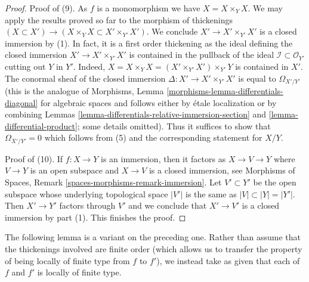 \begin{proof}
\medskip\noindent
Proof of (9). As $f$ is a monomorphism we have $X = X \times_Y X$.
We may apply the results proved so far to the morphism
of thickenings $(X \subset X') \to (X \times_Y X \subset X' \times_{Y'} X')$.
We conclude $X' \to X' \times_{Y'} X'$ is a closed immersion by (1).
In fact, it is a first order thickening as the ideal defining the
closed immersion $X' \to X' \times_{Y'} X'$ is contained in the pullback
of the ideal $\mathcal{I} \subset \mathcal{O}_{Y'}$ cutting out $Y$ in $Y'$.
Indeed, $X = X \times_Y X = (X' \times_{Y'} X') \times_{Y'} Y$ is contained
in $X'$. The conormal sheaf of the closed immersion
$\Delta : X' \to X' \times_{Y'} X'$ is equal to $\Omega_{X'/Y'}$
(this is the analogue of
Morphisms, Lemma \ref{morphisms-lemma-differentials-diagonal}
for algebraic spaces and follows either by \'etale localization
or by combining
Lemmas \ref{lemma-differentials-relative-immersion-section} and
\ref{lemma-differential-product}; some details omitted).
Thus it suffices to show that $\Omega_{X'/Y'} = 0$ which follows from (5)
and the corresponding statement for $X/Y$.

\medskip\noindent
Proof of (10). If $f : X \to Y$ is an immersion, then it factors as
$X \to V \to Y$ where $V \to Y$ is an open subspace and $X \to V$ is a
closed immersion, see
Morphisms of Spaces, Remark \ref{spaces-morphisms-remark-immersion}.
Let $V' \subset Y'$ be the open subspace whose
underlying topological space $|V'|$ is the same as $|V| \subset |Y| = |Y'|$.
Then $X' \to Y'$ factors through $V'$ and we conclude that $X' \to V'$
is a closed immersion by part (1). This finishes the proof.
\end{proof}

\noindent
The following lemma is a variant on the preceding one. Rather than assume
that the thickenings involved are finite order (which allows us to transfer
the property of being locally of finite type from $f$ to $f'$),
we instead take as given that each of $f$ and $f'$ is locally of
finite type.

